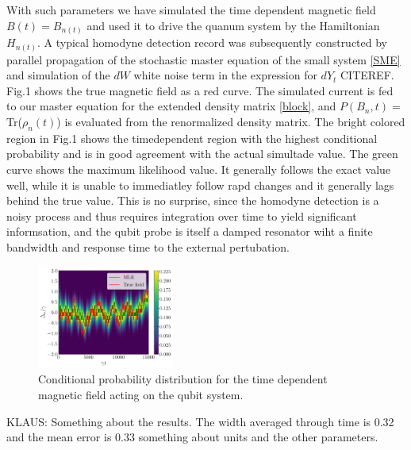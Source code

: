\documentclass[aps,pra,twocolumn,groupedaddress,showpacs]{revtex4}
\begin{document}
With such parameters we have simulated the time dependent magnetic field $B(t)=B_{n(t)}$ and used it to drive the quanum system by the Hamiltonian $H_{n(t)}$. A typical homodyne detection record was subsequently constructed by parallel propagation of the stochastic master equation of the small system \eqref{SME} and  simulation of the $dW$ white noise term in the expression for $dY_t$ CITEREF. Fig.1 shows the true magnetic field as a red curve. The simulated current is fed to our master equation for the extended density matrix \eqref{block}, and $P(B_n,t)=$Tr($\rho_n(t)$) is evaluated from the renormalized density matrix. The bright colored region in Fig.1 shows the timedependent region with the highest conditional probability and is in good agreement with the actual simultade value. The green curve shows the maximum likelihood value. It generally follows the exact value well, while it is unable to immediatley follow rapd changes and it generally lags behind the true value. This is no surprise, since the homodyne detection is a noisy process and thus requires integration over time to yield significant informsation, and the qubit probe is itself a damped resonator wiht a finite bandwidth and response time to the external pertubation.

 \begin{figure}[h!]
    \centering
    \centering
    \includegraphics[width=0.4\textwidth]{filtering.pdf}
    \caption{Conditional probability distribution for the time dependent magnetic field acting on the qubit system. }
\end{figure}

KLAUS: Something about the results.  The width averaged through time is 0.32 and the mean error is 0.33 something about units and the other parameters. 
\end{document}
